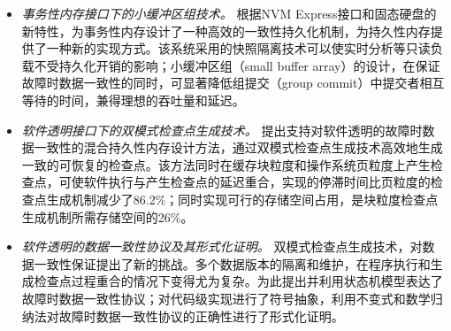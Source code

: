 \begin{cabstract}
\begin{itemize}
\item \emph{事务性内存接口下的小缓冲区组技术。}
根据NVM Express接口和固态硬盘的新特性，为事务性内存设计了一种高效的一致性持久化机制，为持久性内存提供了一种新的实现方式。该系统采用的快照隔离技术可以使实时分析等只读负载不受持久化开销的影响；小缓冲区组（small buffer array）的设计，在保证故障时数据一致性的同时，可显著降低组提交（group commit）中提交者相互等待的时间，兼得理想的吞吐量和延迟。

\item \emph{软件透明接口下的双模式检查点生成技术。}
提出支持对软件透明的故障时数据一致性的混合持久性内存设计方法，通过双模式检查点生成技术高效地生成一致的可恢复的检查点。该方法同时在缓存块粒度和操作系统页粒度上产生检查点，可使软件执行与产生检查点的延迟重合，实现的停滞时间比页粒度的检查点生成机制减少了86.2\%；同时实现可行的存储空间占用，是块粒度检查点生成机制所需存储空间的26\%。

\item \emph{软件透明的数据一致性协议及其形式化证明。}
双模式检查点生成技术，对数据一致性保证提出了新的挑战。多个数据版本的隔离和维护，在程序执行和生成检查点过程重合的情况下变得尤为复杂。为此提出并利用状态机模型表达了故障时数据一致性协议；对代码级实现进行了符号抽象，利用不变式和数学归纳法对故障时数据一致性协议的正确性进行了形式化证明。
\end{itemize}

\end{cabstract}


